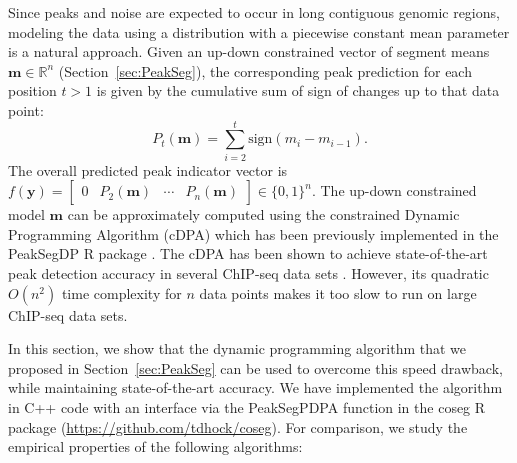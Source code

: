\documentclass{article}
\newcommand{\RR}{\mathbb R}
\begin{document}
Since peaks and noise are expected to occur in long contiguous genomic
regions, modeling the data using a distribution with a piecewise
constant mean parameter is a natural approach. Given an up-down
constrained vector of segment means $\mathbf m\in\RR^n$
(Section~\ref{sec:PeakSeg}), the corresponding peak prediction for each position $t>1$ is
given by the cumulative sum of sign of changes up to that data point:
\begin{equation}
  \label{eq:P_t}
  P_t(\mathbf m) = \sum_{i=2}^t \text{sign}(m_{i}-m_{i-1}).
\end{equation}
The overall predicted peak indicator vector is $
f(\mathbf y)=\left[\begin{array}{cccc}
  0 & P_2(\mathbf m) & \cdots & P_n(\mathbf m)
\end{array}\right]\in\{0,1\}^n.
$
The up-down constrained model $\mathbf m$ can be approximately computed
using the constrained Dynamic Programming Algorithm (cDPA) which has
been previously implemented in the PeakSegDP R package
\citep{HOCKING-PeakSeg}. The cDPA has been shown to achieve
state-of-the-art peak detection accuracy in several ChIP-seq data sets
\citep{HOCKING2016-chipseq}. However, its quadratic $O(n^2)$ time
complexity for $n$ data points makes it too slow to run on large
ChIP-seq data sets.

In this section, we show that the dynamic programming algorithm that
we proposed in Section~\ref{sec:PeakSeg} can be used to overcome this
speed drawback, while maintaining state-of-the-art accuracy. We have
implemented the algorithm in C++ code with an interface via the
PeakSegPDPA function in the coseg R package
(\url{https://github.com/tdhock/coseg}). For comparison, we study the
empirical properties of the following algorithms:
\end{document}
